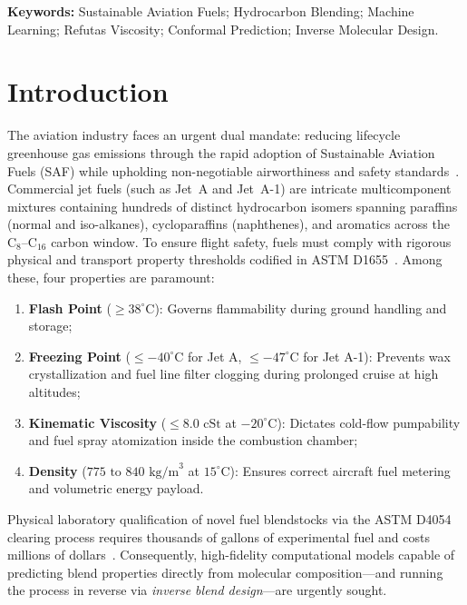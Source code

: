 \documentclass[11pt,a4paper]{article}
\begin{document}
\textbf{Keywords:} Sustainable Aviation Fuels; Hydrocarbon Blending; Machine Learning; Refutas Viscosity; Conformal Prediction; Inverse Molecular Design.

\newpage

\section{Introduction}

The aviation industry faces an urgent dual mandate: reducing lifecycle greenhouse gas emissions through the rapid adoption of Sustainable Aviation Fuels (SAF) while upholding non-negotiable airworthiness and safety standards~\cite{astmd1655, edwards2017reference}. Commercial jet fuels (such as Jet~A and Jet~A-1) are intricate multicomponent mixtures containing hundreds of distinct hydrocarbon isomers spanning paraffins (normal and iso-alkanes), cycloparaffins (naphthenes), and aromatics across the $\text{C}_8$--$\text{C}_{16}$ carbon window. To ensure flight safety, fuels must comply with rigorous physical and transport property thresholds codified in ASTM D1655~\cite{astmd1655}. Among these, four properties are paramount:
\begin{enumerate}
    \item \textbf{Flash Point} ($\ge 38^\circ\text{C}$): Governs flammability during ground handling and storage;
    \item \textbf{Freezing Point} ($\le -40^\circ\text{C}$ for Jet A, $\le -47^\circ\text{C}$ for Jet A-1): Prevents wax crystallization and fuel line filter clogging during prolonged cruise at high altitudes;
    \item \textbf{Kinematic Viscosity} ($\le 8.0\text{ cSt}$ at $-20^\circ\text{C}$): Dictates cold-flow pumpability and fuel spray atomization inside the combustion chamber;
    \item \textbf{Density} ($775\text{ to }840\text{ kg/m}^3$ at $15^\circ\text{C}$): Ensures correct aircraft fuel metering and volumetric energy payload.
\end{enumerate}

Physical laboratory qualification of novel fuel blendstocks via the ASTM D4054 clearing process requires thousands of gallons of experimental fuel and costs millions of dollars~\cite{astmd4054}. Consequently, high-fidelity computational models capable of predicting blend properties directly from molecular composition—and running the process in reverse via \textit{inverse blend design}—are urgently sought.
\end{document}
